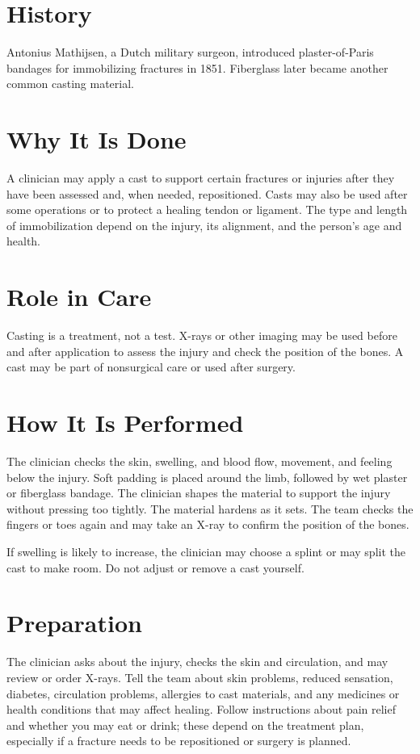 \section*{History}
Antonius Mathijsen, a Dutch military surgeon, introduced plaster-of-Paris bandages for immobilizing fractures in 1851. Fiberglass later became another common casting material.

\section*{Why It Is Done}
A clinician may apply a cast to support certain fractures or injuries after they have been assessed and, when needed, repositioned. Casts may also be used after some operations or to protect a healing tendon or ligament. The type and length of immobilization depend on the injury, its alignment, and the person's age and health.

\section*{Role in Care}
Casting is a treatment, not a test. X-rays or other imaging may be used before and after application to assess the injury and check the position of the bones. A cast may be part of nonsurgical care or used after surgery.

\section*{How It Is Performed}
The clinician checks the skin, swelling, and blood flow, movement, and feeling below the injury. Soft padding is placed around the limb, followed by wet plaster or fiberglass bandage. The clinician shapes the material to support the injury without pressing too tightly. The material hardens as it sets. The team checks the fingers or toes again and may take an X-ray to confirm the position of the bones.

If swelling is likely to increase, the clinician may choose a splint or may split the cast to make room. Do not adjust or remove a cast yourself.

\section*{Preparation}
The clinician asks about the injury, checks the skin and circulation, and may review or order X-rays. Tell the team about skin problems, reduced sensation, diabetes, circulation problems, allergies to cast materials, and any medicines or health conditions that may affect healing. Follow instructions about pain relief and whether you may eat or drink; these depend on the treatment plan, especially if a fracture needs to be repositioned or surgery is planned.

